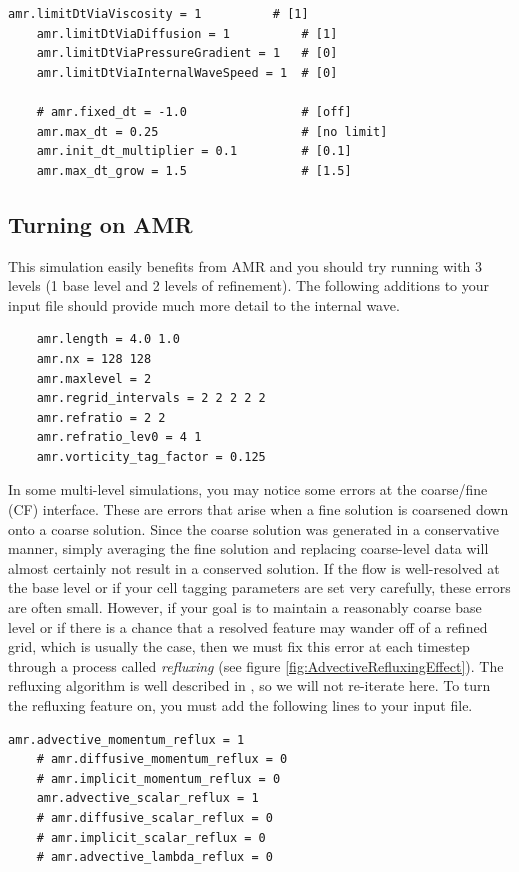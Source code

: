 \documentclass[12pt]{article}
\begin{document}
\begin{lstlisting}[caption={Timestep-limiting input parameters.},label=lstTimestepLimiting]
	amr.limitDtViaViscosity = 1          # [1]
	amr.limitDtViaDiffusion = 1          # [1]
	amr.limitDtViaPressureGradient = 1   # [0]
	amr.limitDtViaInternalWaveSpeed = 1  # [0]

	# amr.fixed_dt = -1.0                # [off]
	amr.max_dt = 0.25                    # [no limit]
	amr.init_dt_multiplier = 0.1         # [0.1]
	amr.max_dt_grow = 1.5                # [1.5]
\end{lstlisting}


\subsection{Turning on AMR}
This simulation easily benefits from AMR and you should try running with 3 levels (1 base level and 2 levels of refinement). The following additions to your input file should provide much more detail to the internal wave.
\begin{lstlisting}
	amr.length = 4.0 1.0
	amr.nx = 128 128
	amr.maxlevel = 2
	amr.regrid_intervals = 2 2 2 2 2
	amr.refratio = 2 2
	amr.refratio_lev0 = 4 1
	amr.vorticity_tag_factor = 0.125
\end{lstlisting}

In some multi-level simulations, you may notice some errors at the coarse/fine (CF) interface. These are errors that arise when a fine solution is coarsened down onto a coarse solution. Since the coarse solution was generated in a conservative manner, simply averaging the fine solution and replacing coarse-level data will almost certainly not result in a conserved solution. If the flow is well-resolved at the base level or if your cell tagging parameters are set very carefully, these errors are often small. However, if your goal is to maintain a reasonably coarse base level or if there is a chance that a resolved feature may wander off of a refined grid, which is usually the case, then we must fix this error at each timestep through a process called \textit{refluxing} (see figure \ref{fig:AdvectiveRefluxingEffect}). The refluxing algorithm is well described in \cite{MartinThesis, Bell1989}, so we will not re-iterate here. To turn the refluxing feature on, you must add the following lines to your input file.
\begin{lstlisting}[caption={The advective refluxing parameters.}]
	amr.advective_momentum_reflux = 1
	# amr.diffusive_momentum_reflux = 0
	# amr.implicit_momentum_reflux = 0
	amr.advective_scalar_reflux = 1
	# amr.diffusive_scalar_reflux = 0
	# amr.implicit_scalar_reflux = 0
	# amr.advective_lambda_reflux = 0
\end{lstlisting}
\end{document}

